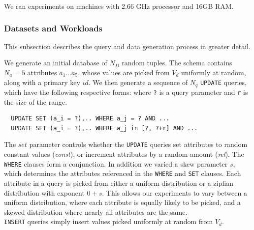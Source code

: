 {
\color{blue} 
We ran experiments on machines with 
2.66 GHz processor and 16GB RAM. 
}

\subsubsection{Datasets and Workloads}

This subsection describes the query and data generation process in greater detail.

 \label{sec:syntheticgen}
{\color{blue} We generate an initial database of $N_D$ random tuples.  
The schema contains $N_a=5$ attributes $a_1\ldots a_5$, whose values are
picked from $V_d$ uniformly at random, along with a primary key $id$.
We then generate a sequence of $N_q$ \texttt{UPDATE} queries, which
have the following respective forms: where \verb|?| is a query parameter 
and \verb|r| is the size of the range. }

{\scriptsize
\begin{verbatim}
  UPDATE SET (a_i = ?),.. WHERE a_j = ? AND ...
  UPDATE SET (a_i = ?),.. WHERE a_j in [?, ?+r] AND ...
\end{verbatim}
}

The $set$ parameter controls whether the \texttt{UPDATE} queries set attributes to random constant values ({\it const}),  
or increment attributes by a random amount ({\it rel}).  The \texttt{WHERE} clauses form a conjunction.
In addition we varied a skew parameter $s$, which determines the attributes referenced in the \texttt{WHERE}
and \texttt{SET} clauses.  Each attribute in a query is picked from either a uniform distribution or 
a zipfian~\cite{zipf} distribution
with exponent $0+s$.  This allows our experiments to vary between a uniform distribution, where each attribute is
equally likely to be picked, and a skewed distribution where nearly all attributes are the same. \\
\iffalse
  \texttt{INSERT} queries simply insert values picked uniformly at random from $V_d$.  

